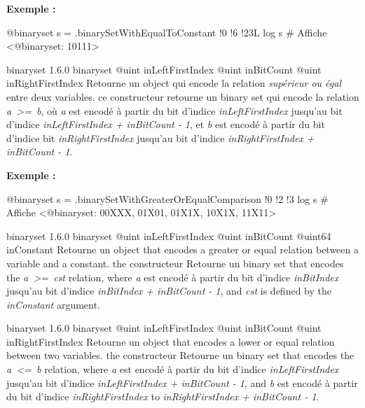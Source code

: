 \textbf{Exemple :}
\begin{galgascode}
@binaryset s = .binarySetWithEqualToConstant {!0 !6 !23L}
log s # Affiche <@binaryset: 10111>
\end{galgascode}





{binaryset}
{1.6.0}
{binaryset}
{@uint inLeftFirstIndex}
{@uint inBitCount}
{@uint inRightFirstIndex}
{Retourne un  object qui encode la relation \emph{supérieur ou égal} entre deux variables.}
{ce constructeur retourne un binary set qui encode la relation \emph{a~>=~b}, où \emph{a} est encodé à partir du bit d'indice \emph{inLeftFirstIndex} jusqu'au bit d'indice \emph{inLeftFirstIndex  + inBitCount - 1}, et \emph{b} est encodé à partir du bit d'indice bit \emph{inRightFirstIndex} jusqu'au bit d'indice \emph{inRightFirstIndex + inBitCount - 1}.}

\textbf{Exemple :}
\begin{galgascode}
@binaryset s = .binarySetWithGreaterOrEqualComparison {!0 !2 !3}
log s # Affiche <@binaryset: 00XXX, 01X01, 01X1X, 10X1X, 11X11>
\end{galgascode}





{binaryset}
{1.6.0}
{binaryset}
{@uint inLeftFirstIndex}
{@uint inBitCount}
{@uint64 inConstant}
{Retourne un  object that encodes a greater or equal relation between a variable and a constant.}
{the constructeur Retourne un binary set that encodes the \emph{a~>=~cst} relation, where \emph {a} est encodé à partir du bit d'indice \emph{inBitIndex} jusqu'au bit d'indice \emph{inBitIndex  + inBitCount - 1}, and \emph{cst} is defined by the \emph{inConstant} argument.}





{binaryset}
{1.6.0}
{binaryset}
{@uint inLeftFirstIndex}
{@uint inBitCount}
{@uint inRightFirstIndex}
{Retourne un  object that encodes a lower or equal relation between two variables.}
{the constructeur Retourne un binary set that encodes the \emph{a~<=~b} relation, where \emph{a} est encodé à partir du bit d'indice \emph{inLeftFirstIndex} jusqu'au bit d'indice \emph{inLeftFirstIndex  + inBitCount - 1}, and \emph{b} est encodé à partir du bit d'indice \emph{inRightFirstIndex} to \emph{inRightFirstIndex + inBitCount - 1}.}

